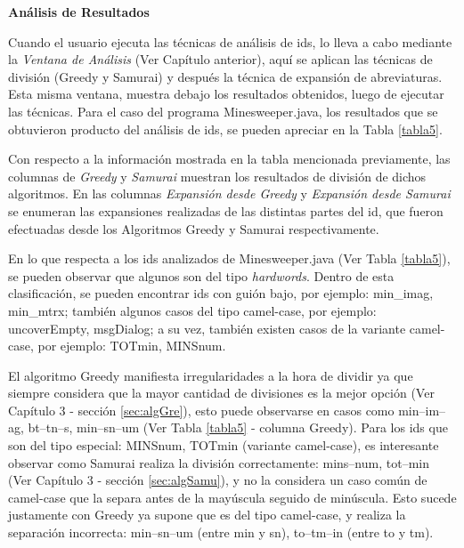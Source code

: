 \clearpage

\noindent \textbf{Análisis de Resultados\\}

Cuando el usuario ejecuta las técnicas de análisis de ids, lo lleva a cabo mediante la \textit{Ventana de Análisis} (Ver Capítulo anterior), aquí se aplican las técnicas de división (Greedy y Samurai) y después la técnica de expansión de abreviaturas. Esta misma ventana, muestra debajo los resultados obtenidos, luego de ejecutar las técnicas. Para el caso del programa Minesweeper.java, los resultados que se obtuvieron producto del análisis de ids, se pueden apreciar en la Tabla \ref{tabla5}.

Con respecto a la información mostrada en la tabla mencionada previamente, las columnas de \textit{Greedy} y \textit{Samurai} muestran los resultados de división de dichos algoritmos. En las columnas \textit{Expansión desde Greedy} y \textit{Expansión desde Samurai} se enumeran las expansiones realizadas de las distintas partes del id, que fueron efectuadas desde los Algoritmos Greedy y Samurai respectivamente.

En lo que respecta a los ids analizados de Minesweeper.java (Ver Tabla \ref{tabla5}), se pueden observar que algunos son del tipo \textit{hardwords}. Dentro de esta clasificación, se pueden encontrar ids con guión bajo, por ejemplo: \textsf{min\_imag}, \textsf{min\_mtrx}; también algunos casos del tipo camel-case, por ejemplo:  \mbox{\textsf{uncoverEmpty}}, \textsf{msgDialog}; a su vez, también existen casos de la variante camel-case, por ejemplo: \textsf{TOTmin}, \textsf{MINSnum}.

El algoritmo Greedy manifiesta irregularidades a la hora de dividir ya que siempre considera que la mayor cantidad de divisiones es la mejor opción (Ver Capítulo 3 - sección \ref{sec:algGre}), esto puede observarse en casos como \textsf{min--im--ag},  \textsf{bt--tn--s}, \textsf{min--sn--um} (Ver Tabla \ref{tabla5} - columna Greedy).
Para los ids que son del tipo especial: \textsf{MINSnum}, \textsf{TOTmin} (variante camel-case), es interesante observar como Samurai realiza la división correctamente: \textsf{mins--num}, \textsf{tot--min} (Ver Capítulo 3 - sección \ref{sec:algSamu}), y no la considera un caso común de camel-case que la separa antes de la mayúscula seguido de minúscula. Esto sucede justamente con Greedy ya supone que es del tipo camel-case, y realiza la separación incorrecta: \mbox{\textsf{min--sn--um}} (entre min y sn), \textsf{to--tm--in} (entre to y tm).

